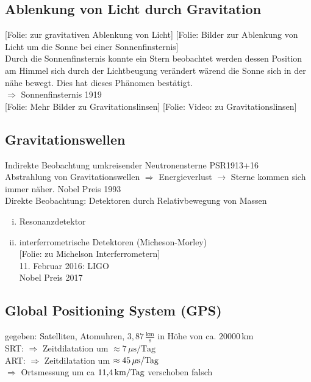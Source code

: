 \documentclass[titlepage,11pt,a4paper,ngerman]{report}
\newcommand{\tx}[1]{\textrm{#1}}
\newcommand{\folie}[1]{\color{gray}[Folie: #1]\color{black}}
\newcommand{\lcom}[1]{\color{MidnightBlue}#1\color{black}}
\begin{document}
\subsection{Ablenkung von Licht durch Gravitation}
\folie{zur gravitativen Ablenkung von Licht} \folie{Bilder zur Ablenkung von Licht um die Sonne bei einer Sonnenfinsternis}\\
\lcom{Durch die Sonnenfinsternis konnte ein Stern beobachtet werden dessen Position am Himmel sich durch der Lichtbeugung verändert wärend die Sonne sich in der nähe bewegt. Dies hat dieses Phänomen bestätigt.}\\
$ \Rightarrow $ Sonnenfinsternis 1919\\
\folie{Mehr Bilder zu Gravitationslinsen} \folie{Video: zu Gravitationslinsen}

\subsection{Gravitationswellen}
Indirekte Beobachtung umkreisender Neutronensterne PSR1913+16\\
Abstrahlung von Gravitationswellen $ \Rightarrow $ Energieverlust $ \rightarrow $ Sterne kommen sich immer näher. Nobel Preis 1993\\[5pt]
Direkte Beobachtung: Detektoren durch Relativbewegung von Massen
\begin{enumerate}[(i)]
	\item Resonanzdetektor
	\item interferrometrische Detektoren (Micheson-Morley)\\
	\folie{zu Michelson Interferrometern}\\
	11. Februar 2016: LIGO\\
	Nobel Preis 2017
\end{enumerate}

\subsection{Global Positioning System (GPS)}
gegeben: Satelliten, Atomuhren, $ 3{,}87 \, \frac{\tx{km}}{\tx{s}} $ in Höhe von ca. $ 20000 \, \tx{km} $\\[5pt]
SRT: $ \Rightarrow $ Zeitdilatation um $ \approx 7 \, \mu \tx{s} / \tx{Tag} $\\
ART: $ \Rightarrow $ Zeitdilatation um $ \approx 45 \, \mu \tx{s/\tx{Tag}} $\\[5pt]
$ \Rightarrow $ Ortsmessung um ca $ 11{,}4 \, \tx{km/\tx{Tag}} $ verschoben falsch
\end{document}
